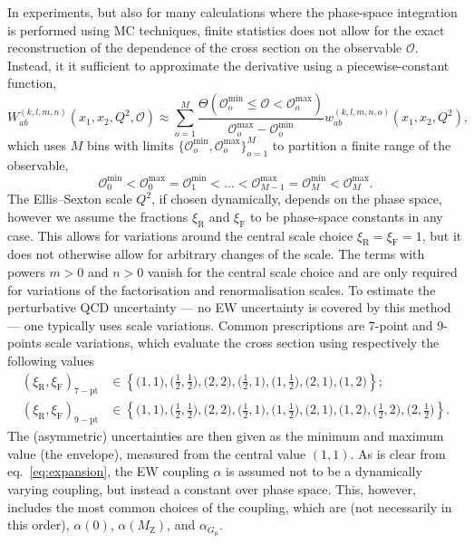 In experiments, but also for many calculations where the phase-space integration is performed using MC techniques, finite statistics does not allow for the exact reconstruction of the dependence of the cross section on the observable $\mathcal{O}$.
Instead, it it sufficient to approximate the derivative using a piecewise-constant function,
\begin{equation}
W_{ab}^{(k,l,m,n)} \left( x_1, x_2, Q^2, \mathcal{O} \right) \approx \sum_{o=1}^M \frac{\Theta (\mathcal{O}_o^\mathrm{min} \le \mathcal{O} < \mathcal{O}_o^\mathrm{max})}{\mathcal{O}_o^\mathrm{max} - \mathcal{O}_o^\mathrm{min}} w_{ab}^{(k,l,m,n,o)} \left( x_1, x_2, Q^2 \right) \text{,}
\label{eq:differential-cross-section}
\end{equation}
which uses $M$ bins with limits $\{ \mathcal{O}_o^\mathrm{min}, \mathcal{O}_o^\mathrm{max} \}_{o=1}^M$ to partition a finite range of the observable,
\begin{equation}
\mathcal{O}_0^\mathrm{min} < \mathcal{O}_0^\mathrm{max} = \mathcal{O}_1^\mathrm{min} < \ldots < \mathcal{O}_{M-1}^\mathrm{max} = \mathcal{O}_M^\mathrm{min} < \mathcal{O}_M^\mathrm{max} \text{.}
\label{eq:bins-of-diff-xsection}
\end{equation}
The Ellis--Sexton scale $Q^2$, if chosen dynamically, depends on the phase space, however we assume the fractions $\xi_\mathrm{R}$ and $\xi_\mathrm{F}$ to be  phase-space constants in any case.
This allows for variations around the central scale choice $\xi_\mathrm{R} = \xi_\mathrm{F} = 1$, but it does not otherwise allow for arbitrary changes of the scale.
The terms with powers $m > 0$ and $n > 0$ vanish for the central scale choice and are only required for variations of the factorisation and renormalisation scales.
To estimate the perturbative QCD uncertainty --- no EW uncertainty is covered by this method --- one typically uses scale variations. Common prescriptions are
7-point and 9-points scale variations, which evaluate the cross section using
respectively the following values
  \begin{align}
    (\xi_\mathrm{R}, \xi_\mathrm{F})_{\mathrm{7-pt}}
    & \in
    \left\{ \bigl( 1, 1 \bigr), \bigl( \tfrac{1}{2}, \tfrac{1}{2} \bigr), \bigl( 2, 2 \bigr), \bigl( \tfrac{1}{2}, 1 \bigr), \bigl( 1, \tfrac{1}{2} \bigr), \bigl( 2, 1 \bigr), \bigl( 1, 2 \bigr) \right\} \text{;}
    \label{eq:7pt}\\
    (\xi_\mathrm{R}, \xi_\mathrm{F})_{\mathrm{9-pt}}
    & \in
    \left\{ \bigl( 1, 1 \bigr), \bigl( \tfrac{1}{2}, \tfrac{1}{2} \bigr), \bigl( 2, 2 \bigr), \bigl( \tfrac{1}{2}, 1 \bigr), \bigl( 1, \tfrac{1}{2} \bigr), \bigl( 2, 1 \bigr), \bigl( 1, 2 \bigr), \bigl( \tfrac{1}{2}, 2 \bigr), \bigl(2, \tfrac{1}{2} \bigr) \right\}  \text{.}
    \label{eq:9pt}
   \end{align}
The (asymmetric) uncertainties are then given as the minimum and maximum value (the envelope), measured from the central value $(1, 1)$.
As is clear from eq.~\eqref{eq:expansion}, the EW coupling $\alpha$ is assumed not to be a dynamically varying coupling, but instead a constant over phase space.
This, however, includes the most common choices of the coupling, which are (not necessarily in this order), $\alpha (0)$, $\alpha (M_\mathrm{Z})$, and $\alpha_{G_\mu}$.

